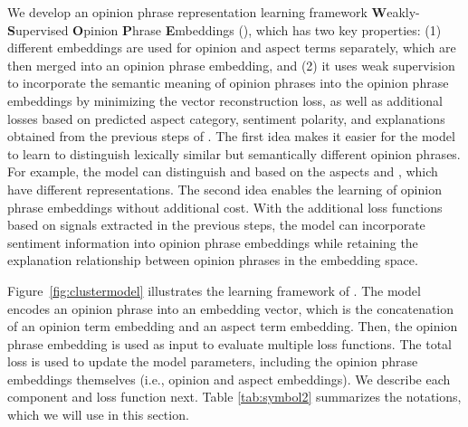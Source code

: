 We develop an opinion phrase representation learning framework {\bf W}eakly-{\bf S}upervised {\bf O}pinion {\bf P}hrase {\bf E}mbeddings (\canonical), which has two key properties: (1) different embeddings are used for opinion and aspect terms separately, which are then merged into an opinion phrase embedding, and (2) it uses weak supervision to incorporate the semantic meaning of opinion phrases into the opinion phrase embeddings by minimizing the vector reconstruction loss, as well as additional losses based on predicted aspect category, sentiment polarity, and explanations obtained from the previous steps of \system.
The first idea makes it easier for the model to learn to distinguish lexically similar but semantically different opinion phrases. For example, the model can distinguish  and  based on the aspects  and , which have different representations. The second idea enables the learning of opinion phrase embeddings without additional cost. With the additional loss functions based on signals extracted in the previous steps, the model can incorporate sentiment information into opinion phrase embeddings while retaining the explanation relationship between opinion phrases in the embedding space.

Figure~\ref{fig:clustermodel} illustrates 
the learning framework of \canonical. The model encodes an opinion phrase into an embedding vector, which is the concatenation of an opinion term embedding and an aspect term embedding. Then, the opinion phrase embedding is used as input to evaluate multiple loss functions. The total loss is used to update the model parameters, including the opinion phrase embeddings themselves (i.e., opinion and aspect embeddings). We describe each component and loss function next. Table \ref{tab:symbol2} summarizes the notations, which we will use in this section.

